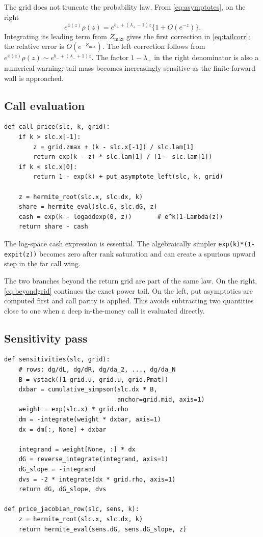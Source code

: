 The grid does not truncate the probability law.  From
\eqref{eq:asymptotes}, on the right
\[
e^{\bar x(z)}\rho(z)
=e^{b_++(\lambda_+-1)z}\{1+O(e^{-z})\}.
\]
Integrating its leading term from $Z_{\max}$ gives the first correction in
\eqref{eq:tailcorr}; the relative error is $O(e^{-Z_{\max}})$.  The left
correction follows from
$e^{\bar x(z)}\rho(z)\sim e^{b_-+(\lambda_-+1)z}$.
The factor $1-\lambda_+$ in the right denominator is also a numerical warning:
tail mass becomes increasingly sensitive as the finite-forward wall is
approached.

\subsection{Call evaluation}

\begin{lstlisting}[caption={Evaluate a normalized call.}]
def call_price(slc, k, grid):
    if k > slc.x[-1]:
        z = grid.zmax + (k - slc.x[-1]) / slc.lam[1]
        return exp(k - z) * slc.lam[1] / (1 - slc.lam[1])
    if k < slc.x[0]:
        return 1 - exp(k) + put_asymptote_left(slc, k, grid)

    z = hermite_root(slc.x, slc.dx, k)
    share = hermite_eval(slc.G, slc.dG, z)
    cash = exp(k - logaddexp(0, z))       # e^k(1-Lambda(z))
    return share - cash
\end{lstlisting}

The log-space cash expression is essential.  The algebraically simpler
\texttt{exp(k)*(1-expit(z))} becomes zero after rank saturation and can create
a spurious upward step in the far call wing.

The two branches beyond the return grid are part of the same law.  On the
right, \eqref{eq:beyondgrid} continues the exact power tail.  On the left,
put asymptotics are computed first and call parity is applied.  This avoids
subtracting two quantities close to one when a deep in-the-money call is
evaluated directly.

\subsection{Sensitivity pass}

\begin{lstlisting}[caption={All raw-coordinate Jacobian columns on one build.}]
def sensitivities(slc, grid):
    # rows: dg/dL, dg/dR, dg/da_2, ..., dg/da_N
    B = vstack([1-grid.u, grid.u, grid.Pmat])
    dxbar = cumulative_simpson(slc.dx * B,
                               anchor=grid.mid, axis=1)
    weight = exp(slc.x) * grid.rho
    dm = -integrate(weight * dxbar, axis=1)
    dx = dm[:, None] + dxbar

    integrand = weight[None, :] * dx
    dG = reverse_integrate(integrand, axis=1)
    dG_slope = -integrand
    dvs = -2 * integrate(dx * grid.rho, axis=1)
    return dG, dG_slope, dvs

def price_jacobian_row(slc, sens, k):
    z = hermite_root(slc.x, slc.dx, k)
    return hermite_eval(sens.dG, sens.dG_slope, z)
\end{lstlisting}

